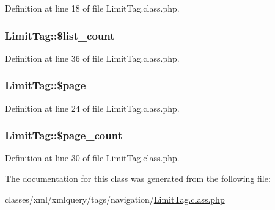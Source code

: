 Definition at line 18 of file Limit\+Tag.\+class.\+php.

\subsubsection[{\texorpdfstring{\$list\+\_\+count}{$list_count}}]{\setlength{\rightskip}{0pt plus 5cm}Limit\+Tag\+::\$list\+\_\+count}\hypertarget{classLimitTag_aec51c8433d2e7a1e009b7c331702cef0}{}\label{classLimitTag_aec51c8433d2e7a1e009b7c331702cef0}


Definition at line 36 of file Limit\+Tag.\+class.\+php.

\subsubsection[{\texorpdfstring{\$page}{$page}}]{\setlength{\rightskip}{0pt plus 5cm}Limit\+Tag\+::\$page}\hypertarget{classLimitTag_aae0faff40b6bcd38d72350bd851ecd4b}{}\label{classLimitTag_aae0faff40b6bcd38d72350bd851ecd4b}


Definition at line 24 of file Limit\+Tag.\+class.\+php.

\subsubsection[{\texorpdfstring{\$page\+\_\+count}{$page_count}}]{\setlength{\rightskip}{0pt plus 5cm}Limit\+Tag\+::\$page\+\_\+count}\hypertarget{classLimitTag_a3d25270d024a280ac3e1cc7ada2c8fe0}{}\label{classLimitTag_a3d25270d024a280ac3e1cc7ada2c8fe0}


Definition at line 30 of file Limit\+Tag.\+class.\+php.



The documentation for this class was generated from the following file\+:\begin{DoxyCompactItemize}
\item 
classes/xml/xmlquery/tags/navigation/\hyperlink{LimitTag_8class_8php}{Limit\+Tag.\+class.\+php}\end{DoxyCompactItemize}
